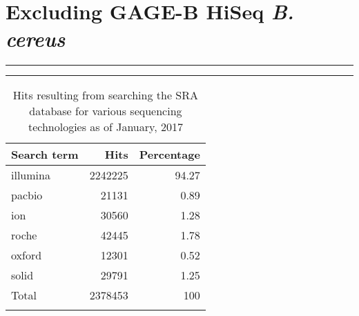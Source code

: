 \documentclass[10pt]{article}
\def \thoughtbr {\begin{center}\noindent\rule{.4\textwidth}{0.4pt}  {\raisebox{-.5ex}{$\sim$}}  \rule{.4\textwidth}{0.4pt}\end{center}}
\begin{document}
\section*{Excluding GAGE-B HiSeq \textit{B. cereus}}


\thoughtbr
\newpage

\begin{table}[]
  \centering
  \caption{Hits resulting from searching the SRA database for various sequencing technologies as of January, 2017}
  \label{table:searchterms}
  \begin{tabular}{lrr}
    \toprule
    Search term & Hits & Percentage \\
    \midrule
    illumina & 2242225 & 94.27 \\
    pacbio & 21131 & 0.89 \\
    ion & 30560 & 1.28 \\
    roche & 42445 & 1.78 \\
    oxford & 12301 & 0.52 \\
    solid & 29791 & 1.25 \\
    \arrayrulecolor{lgray}\hline
    Total & 2378453 & 100\\
    \arrayrulecolor{black}
    \bottomrule
\end{tabular}
\end{table}
\end{document}
